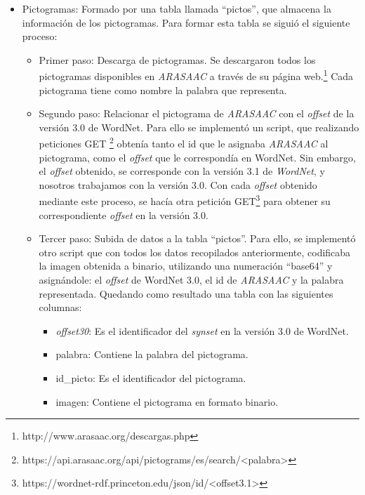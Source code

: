 \begin{itemize}
	 
	\item Pictogramas: Formado por una tabla llamada ``pictos'', que almacena la información de los pictogramas. Para formar esta tabla se siguió el siguiente proceso:
	\begin{itemize}
		\item Primer paso: Descarga de pictogramas. Se descargaron todos los pictogramas disponibles en \textit{ARASAAC} a través de su página web.\footnote{http://www.arasaac.org/descargas.php} Cada pictograma tiene como nombre la palabra que representa.
		\item Segundo paso: Relacionar el pictograma de \textit{ARASAAC} con el \textit{offset} de la versión 3.0 de WordNet. Para ello se implementó un script, que realizando peticiones GET \footnote{https://api.arasaac.org/api/pictograms/es/search/<palabra>} obtenía tanto el id que le asignaba \textit{ARASAAC} al pictograma, como el \textit{offset} que le correspondía en WordNet. Sin embargo, el \textit{offset} obtenido, se corresponde con la versión 3.1 de \textit{WordNet}, y nosotros trabajamos con la versión 3.0. Con cada \textit{offset} obtenido mediante este proceso, se hacía otra petición GET\footnote{https://wordnet-rdf.princeton.edu/json/id/<offset3.1>} para obtener su correspondiente \textit{offset} en la versión 3.0.
		\item Tercer paso: Subida de datos a la tabla ``pictos''. Para ello, se implementó otro script que con todos los datos recopilados anteriormente, codificaba la imagen obtenida a binario, utilizando una numeración ``base64'' y asignándole: el \textit{offset} de WordNet 3.0, el id de \textit{ARASAAC} y la palabra representada. Quedando como resultado una tabla con las siguientes columnas:
		\begin{itemize}
			\item \textit{offset30}: Es el identificador del \textit{synset} en la versión 3.0 de WordNet.
			\item palabra: Contiene la palabra del pictograma.
			\item id\_picto: Es el identificador del pictograma.
			\item imagen: Contiene el pictograma en formato binario.
		\end{itemize}
		
	\end{itemize}
	

\end{itemize}

